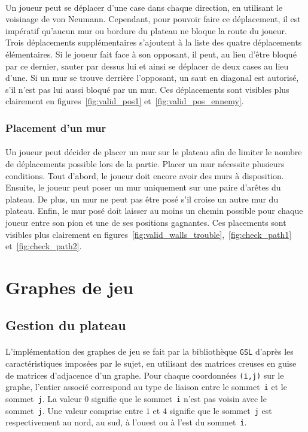 \documentclass[a4paper]{article}
\begin{document}
\paragraph{}
Un joueur peut se déplacer d'une case dans chaque direction, en utilisant le voisinage de von Neumann\cite{voisinage}. Cependant, pour pouvoir faire ce déplacement, il est impératif qu'aucun mur ou bordure du plateau ne bloque la route du joueur. Trois déplacements supplémentaires s'ajoutent à la liste des quatre déplacements élémentaires. Si le joueur fait face à son opposant, il peut, au lieu d'être bloqué par ce dernier, sauter par dessus lui et ainsi se déplacer de deux cases au lieu d'une. Si un mur se trouve derrière l'opposant, un saut en diagonal est autorisé, s'il n'est pas lui aussi bloqué par un mur. Ces déplacements sont visibles plus clairement en figures~\ref{fig:valid_pos1} et~\ref{fig:valid_pos_ennemy}.

\subsubsection{Placement d'un mur}
\paragraph{}
Un joueur peut décider de placer un mur sur le plateau afin de limiter le nombre de déplacements possible lors de la partie. Placer un mur nécessite plusieurs conditions. Tout d'abord, le joueur doit encore avoir des murs à disposition. Ensuite, le joueur peut poser un mur uniquement sur une paire d'arêtes du plateau. De plus, un mur ne peut pas être posé s'il croise un autre mur du plateau. Enfin, le mur posé doit laisser au moins un chemin possible pour chaque joueur entre son pion et une de ses positions gagnantes. Ces placements sont visibles plus clairement en figures~\ref{fig:valid_walls_trouble},~\ref{fig:check_path1} et~\ref{fig:check_path2}.

\clearpage
\section{Graphes de jeu}

\subsection{Gestion du plateau}
\paragraph{}
L'implémentation des graphes de jeu se fait par la bibliothèque \texttt{GSL} d'après les caractéristiques imposées par le sujet, en utilisant des matrices creuses en guise de matrices d'adjacence d'un graphe. Pour chaque coordonnées \texttt{(i,j)} sur le graphe, l'entier associé correspond au type de liaison entre le sommet~\texttt{i} et le sommet~\texttt{j}. La valeur $0$ signifie que le sommet~\texttt{i} n'est pas voisin avec le sommet~\texttt{j}. Une valeur comprise entre $1$ et $4$ signifie que le sommet~\texttt{j} est respectivement au nord, au sud, à l'ouest ou à l'est du sommet~\texttt{i}.
\end{document}
